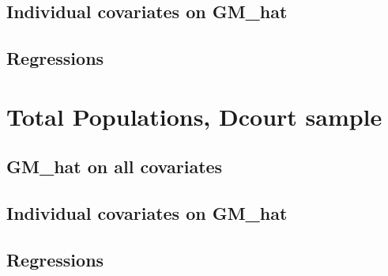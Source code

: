\documentclass{article}
\begin{document}
\subsection{Individual covariates on GM\_hat}

\clearpage
\subsection{Regressions}
\begin{landscape}

\clearpage

\clearpage

\clearpage

\clearpage
\end{landscape}

\section{Total Populations, Dcourt sample}
\subsection{GM\_hat on all covariates}

\clearpage
\subsection{Individual covariates on GM\_hat}

\clearpage
\subsection{Regressions}
\begin{landscape}

\clearpage

\clearpage

\clearpage

\clearpage
\end{landscape}
\end{document}
